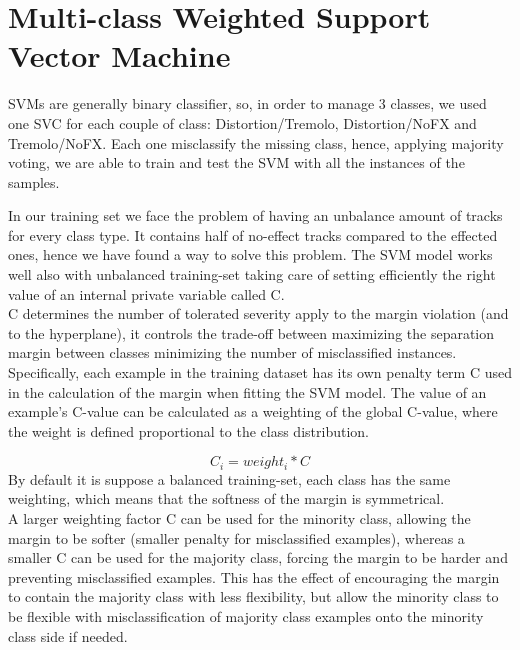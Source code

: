 \documentclass[a4paper,12pt]{report}
\begin{document}
\section{Multi-class Weighted Support Vector Machine}
SVMs are generally binary classifier, so, in order to manage 3 classes, we used one SVC for each couple of class: Distortion/Tremolo, Distortion/NoFX and Tremolo/NoFX. Each one misclassify the missing class, hence, applying majority voting, we are able to train and test the SVM with all the instances of the samples.

In our training set we face the problem of having an unbalance amount of tracks for every class type. It contains half of no-effect tracks compared to the effected ones, hence we have found a way to solve this problem. The SVM model works well also with unbalanced training-set taking care of setting efficiently the right value of an internal private variable called C.\\ C  determines the number of tolerated severity apply to the margin violation (and to the hyperplane), it controls the trade-off between maximizing the separation margin between classes minimizing the number of misclassified instances.
Specifically, each example in the training dataset has its own penalty term C used in the calculation of the margin when fitting the SVM model. The value of an example’s C-value can be calculated as a weighting of the global C-value, where the weight is defined proportional to the class distribution. 

$$C_i = weight_i * C$$
By default it is suppose a balanced training-set, each class has the same weighting, which means that the softness of the margin is symmetrical.\\ A larger weighting factor C can be used for the minority class, allowing the margin to be softer (smaller penalty for misclassified examples), whereas a smaller C can be used for the majority class, forcing the margin to be harder and preventing misclassified examples.
This has the effect of encouraging the margin to contain the majority class with less flexibility, but allow the minority class to be flexible with misclassification of majority class examples onto the minority class side if needed.
\end{document}
